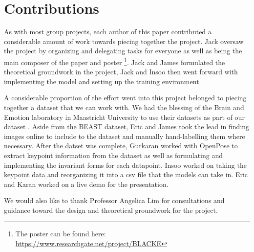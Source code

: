 \documentclass{article}
\begin{document}
\section{Contributions}

As with most group projects, each author of this paper contributed a considerable amount of work towards piecing together the project. Jack oversaw the project by organizing and delegating tasks for everyone as well as being the main composer of the paper and poster \footnote{The poster can be found here: \url{https://www.researchgate.net/project/BLACKE}}. Jack and James formulated the theoretical groundwork in the project, Jack and Insoo then went forward with implementing the model and setting up the training environment.

A considerable proportion of the effort went into this project belonged to piecing together a dataset that we can work with. We had the blessing of the Brain and Emotion laboratory in Maastricht University to use their datasets as part of our dataset \citep{de2011bodily}\citep{stienen2012computational}. Aside from the BEAST dataset, Eric and James took the lead in finding images online to include to the dataset and manually hand-labelling them where necessary. After the datset was complete, Gurkaran worked with OpenPose to extract keypoint information from the dataset as well as formulating and implementing the invariant forms for each datapoint. Insoo worked on taking the keypoint data and reorganizing it into a csv file that the models can take in. Eric and Karan worked on a live demo for the presentation.

We would also like to thank Professor Angelica Lim for consultations and guidance toward the design and theoretical groundwork for the project.



\end{document}
